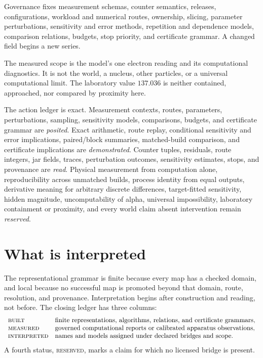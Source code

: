 Governance fixes measurement schemas, counter semantics, releases, configurations, workload and numerical routes,
ownership, slicing, parameter perturbations, sensitivity and error methods, repetition and dependence models,
comparison relations, budgets, stop priority, and certificate grammar.  A changed field begins a new series.

The measured scope is the model's one electron reading and its computational diagnostics.  It is not the world, a
nucleus, other particles, or a universal computational limit.  The laboratory value \(137.036\) is neither contained,
approached, nor compared by proximity here.

The action ledger is exact.  Measurement contexts, routes, parameters, perturbations, sampling, sensitivity models,
comparisons, budgets, and certificate grammar are \emph{posited}.  Exact arithmetic, route replay, conditional
sensitivity and error implications, paired/block summaries, matched-build comparison, and certificate implications
are \emph{demonstrated}.  Counter tuples, residuals, route integers, jar fields, traces, perturbation outcomes,
sensitivity estimates, stops, and provenance are \emph{read}.  Physical measurement from computation alone,
reproducibility across unmatched builds, process identity from equal outputs, derivative meaning for arbitrary
discrete differences, target-fitted sensitivity, hidden magnitude, uncomputability of alpha, universal impossibility,
laboratory containment or proximity, and every world claim absent intervention remain \emph{reserved}.
\section{What is interpreted}

The representational grammar is finite because every map has a checked domain, and local because no successful map
is promoted beyond that domain, route, resolution, and provenance.  Interpretation begins after construction and
reading, not before.  The closing ledger has three columns:
\[
\begin{array}{ll}
\textsc{built}&\text{finite representations, algorithms, relations, and certificate grammars},\\
\textsc{measured}&\text{governed computational reports or calibrated apparatus observations},\\
\textsc{interpreted}&\text{names and models assigned under declared bridges and scope}.
\end{array}
\]
A fourth status, \textsc{reserved}, marks a claim for which no licensed bridge is present.

